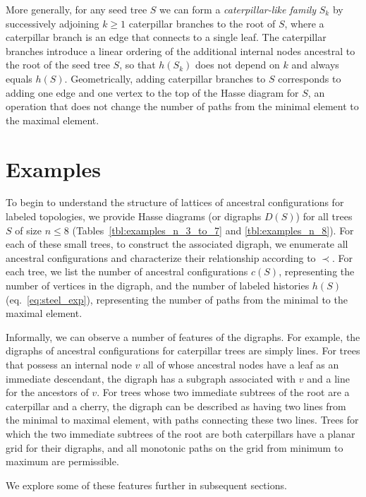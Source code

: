 \documentclass[10pt]{article}
\begin{document}
More generally, for any seed tree $S$ we can form a \emph{caterpillar-like family} $S_k$ by successively adjoining $k \geq 1$ caterpillar branches to the root of $S$, where a caterpillar branch is an edge that connects to a single leaf. The caterpillar branches introduce a linear ordering of the additional internal nodes ancestral to the root of the seed tree $S$, so that $h(S_k)$ does not depend on $k$ and always equals $h(S)$. Geometrically, adding caterpillar branches to $S$ corresponds to adding one edge and one vertex to the top of the Hasse diagram for $S$, an operation that does not change the number of paths from the minimal element to the maximal element.

\section{Examples}\label{sec:examples}

To begin to understand the structure of lattices of ancestral configurations for labeled topologies, we provide Hasse diagrams (or digraphs $D(S)$) for all trees $S$ of size $n \leq 8$ (Tables~\ref{tbl:examples_n_3_to_7} and \ref{tbl:examples_n_8}). For each of these small trees, to construct the associated digraph, we enumerate all ancestral configurations and characterize their relationship according to $\prec$. For each tree, we list the number of ancestral configurations $c(S)$, representing the number of vertices in the digraph, and the number of labeled histories $h(S)$ (eq.~\ref{eq:steel_exp}), representing the number of paths from the minimal to the maximal element.

Informally, we can observe a number of features of the digraphs. For example, the digraphs of ancestral configurations for caterpillar trees are simply lines. For trees that possess an internal node $v$ all of whose ancestral nodes have a leaf as an immediate descendant, the digraph has a subgraph associated with $v$ and a line for the ancestors of $v$. For trees whose two immediate subtrees of the root are a caterpillar and a cherry, the digraph can be described as having two lines from the minimal to maximal element, with paths connecting these two lines. Trees for which the two immediate subtrees of the root are both caterpillars have a planar grid for their digraphs, and all monotonic paths on the grid from minimum to maximum are permissible.

We explore some of these features further in subsequent sections. 
\end{document}
